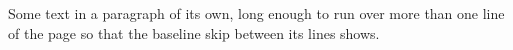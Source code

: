 \documentclass{article}
\begin{document}
Some text in a paragraph of its own, long enough to run over more than one line of the page so that the
baseline skip between its lines shows.
\end{document}
